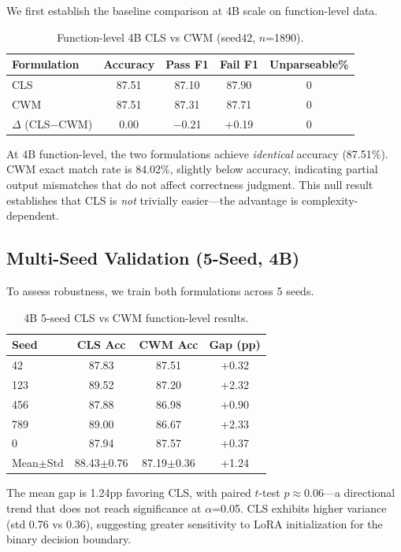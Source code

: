 \documentclass[11pt,a4paper]{article}
\begin{document}
We first establish the baseline comparison at 4B scale on function-level data.

\begin{table}[h]
\centering
\caption{Function-level 4B CLS vs CWM (seed42, $n$=1890).}
\label{tab:func4b}
\begin{tabular}{lcccc}
\toprule
Formulation & Accuracy & Pass F1 & Fail F1 & Unparseable\% \\
\midrule
CLS & 87.51 & 87.10 & 87.90 & 0 \\
CWM & 87.51 & 87.31 & 87.71 & 0 \\
$\Delta$ (CLS$-$CWM) & 0.00 & $-$0.21 & +0.19 & 0 \\
\bottomrule
\end{tabular}
\end{table}

At 4B function-level, the two formulations achieve \emph{identical} accuracy (87.51\%). CWM exact match rate is 84.02\%, slightly below accuracy, indicating partial output mismatches that do not affect correctness judgment. This null result establishes that CLS is \emph{not} trivially easier---the advantage is complexity-dependent.

\subsection{Multi-Seed Validation (5-Seed, 4B)}
\label{sec:multiseed}

To assess robustness, we train both formulations across 5 seeds.

\begin{table}[h]
\centering
\caption{4B 5-seed CLS vs CWM function-level results.}
\label{tab:5seed}
\begin{tabular}{lccc}
\toprule
Seed & CLS Acc & CWM Acc & Gap (pp) \\
\midrule
42  & 87.83 & 87.51 & +0.32 \\
123 & 89.52 & 87.20 & +2.32 \\
456 & 87.88 & 86.98 & +0.90 \\
789 & 89.00 & 86.67 & +2.33 \\
0   & 87.94 & 87.57 & +0.37 \\
\midrule
Mean$\pm$Std & 88.43$\pm$0.76 & 87.19$\pm$0.36 & +1.24 \\
\bottomrule
\end{tabular}
\end{table}

The mean gap is 1.24pp favoring CLS, with paired $t$-test $p\approx0.06$---a directional trend that does not reach significance at $\alpha$=0.05. CLS exhibits higher variance (std 0.76 vs 0.36), suggesting greater sensitivity to LoRA initialization for the binary decision boundary.
\end{document}
